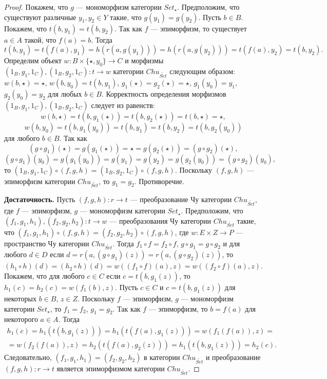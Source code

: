 \documentclass[a4paper,12pt]{article}
\begin{document}
\begin{proof}
    Покажем, что $g$ --- мономорфизм категории $Set_{\star}$. Предположим, что существуют различные $y_1, y_2 \in Y$ такие, что $g(y_1) = g(y_2)$. Пусть $b \in B$. Покажем, что $t(b,y_1) = t(b,y_2)$. Так как $f$ --- эпиморфизм, то существует $a \in A$ такой, что $f(a) = b$. Тогда
    $$
        t(b,y_1) = t(f(a),y_1) = h(r(a,g(y_1))) = h(r(a,g(y_2))) = t(f(a),y_2) = t(b,y_2).
    $$
    Определим объект $w: B \times \{\star,y_0\} \to C$ и морфизмы $(1_B,g_1,1_C), (1_B,g_2,1_C): t \to w$ категории $Chu_{\widetilde{Set}}$ следующим образом: $w(b,\star) = \star$, $w(b,y_0) = t(b,y_1)$, $g_1(\star) = g_2(\star) = \star$, $g_1(y_0) = y_1$, $g_2(y_0) = y_2$ для любых $b \in B$. Корректность определения морфизмов $(1_B,g_1,1_C), (1_B,g_2,1_C)$ следует из равенств:
    $$
        w(b,\star) = t(b,g_1(\star)) = t(b,g_2(\star)) = t(b,\star) = \star,
    $$
    $$
        w(b,y_0) = t(b,g_1(y_0)) = t(b,y_1) = t(b,y_2) = t(b,g_2(y_0))
    $$
    для любого $b \in B$. Так как
    $$
        (g \circ g_1)(\star) = g(g_1(\star)) = \star = g(g_2(\star)) = (g \circ g_2)(\star),
    $$
    $$
        (g \circ g_1)(y_0) = g(g_1(y_0)) = g(y_1) = g(y_2) = g(g_2(y_0)) = (g \circ g_2)(y_0),
    $$
    то $(1_B,g_1,1_C) \circ (f,g,h) = (1_B,g_2,1_C) \circ (f,g,h)$. Поскольку $(f,g,h)$ --- эпиморфизм категории $Chu_{\widetilde{Set}}$, то $g_1 = g_2$. Противоречие.

    \textbf{Достаточность.} Пусть $(f,g,h): r \to t$ --- преобразование Чу категории $Chu_{\widetilde{Set}}$, где $f$ --- эпиморфизм, $g$ --- мономорфизм категории $Set_{\star}$. Предположим, что $(f_1,g_1,h_1), (f_2,g_2,h_2): t \to w$ --- преобразования Чу категории $Chu_{\widetilde{Set}}$ такие, что $(f_1,g_1,h_1) \circ (f,g,h) = (f_2,g_2,h_2) \circ (f,g,h)$, где $w: E \times Z \to P$ --- пространство Чу категории $Chu_{\widetilde{Set}}$. Тогда $f_1 \circ f = f_2 \circ f$, $g \circ g_1 = g \circ g_2$ и для любого $d \in D$ если $d = r(a,(g \circ g_1)(z)) = r(a,(g \circ g_2)(z))$, то $(h_1 \circ h)(d) = (h_2 \circ h)(d) = w((f_1 \circ f)(a), z) = w((f_2 \circ f)(a), z)$. Покажем, что для любого $c \in C$ если $c = t(b,g_1(z))$, то $h_1(c) = h_2(c) = w(f_1(b),z)$. Пусть $c \in C$ и $c = t(b,g_1(z))$ для некоторых $b \in B$, $z \in Z$. Поскольку $f$ --- эпиморфизм, $g$ --- мономорфизм категории $Set_{\star}$, то $f_1 = f_2$, $g_1 = g_2$. Так как $f$ --- эпиморфизм, то $b = f(a)$ для некоторого $a \in A$. Тогда 
    \begin{multline*}
        h_1(c) = h_1(t(b,g_1(z))) = h_1(t(f(a),g_1(z))) = w(f_1(f(a)),z) =\\=
        w(f_2(f(a)),z) = h_2(t(f(a),g_2(z))) = h_1(t(b,g_1(z))) = h_2(c).
    \end{multline*}
    Следовательно, $(f_1,g_1,h_1) = (f_2,g_2,h_2)$ в категории $Chu_{\widetilde{Set}}$ и преобразование $(f,g,h): r \to t$ является эпиморфизмом категории $Chu_{\widetilde{Set}}$.
\end{proof}
\end{document}
